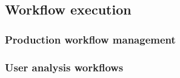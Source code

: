 \subsection{Workflow execution}
\label{sec:workflow}

\subsubsection{Production workflow management}





\subsubsection{User analysis workflows}







